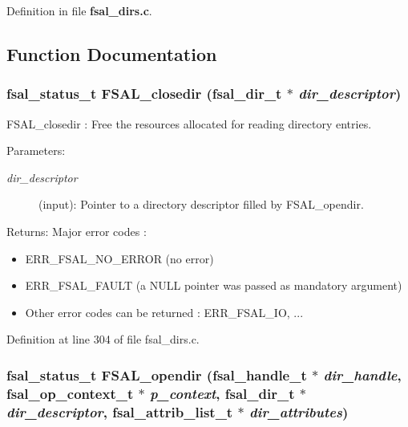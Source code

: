 Definition in file {\bf fsal\_\-dirs.c}.

\subsection{Function Documentation}
\subsubsection[{FSAL\_\-closedir}]{\setlength{\rightskip}{0pt plus 5cm}fsal\_\-status\_\-t FSAL\_\-closedir (fsal\_\-dir\_\-t $\ast$ {\em dir\_\-descriptor})}\label{fsal__dirs_8c_b143cc191cced85fbcaa570922a76556}


FSAL\_\-closedir : Free the resources allocated for reading directory entries.

\begin{Desc}
\item[Parameters:]
\begin{description}
\item[{\em dir\_\-descriptor}](input): Pointer to a directory descriptor filled by FSAL\_\-opendir.\end{description}
\end{Desc}
\begin{Desc}
\item[Returns:]Major error codes :\begin{itemize}
\item ERR\_\-FSAL\_\-NO\_\-ERROR (no error)\item ERR\_\-FSAL\_\-FAULT (a NULL pointer was passed as mandatory argument)\item Other error codes can be returned : ERR\_\-FSAL\_\-IO, ... \end{itemize}
\end{Desc}


Definition at line 304 of file fsal\_\-dirs.c.
\subsubsection[{FSAL\_\-opendir}]{\setlength{\rightskip}{0pt plus 5cm}fsal\_\-status\_\-t FSAL\_\-opendir (fsal\_\-handle\_\-t $\ast$ {\em dir\_\-handle}, \/  fsal\_\-op\_\-context\_\-t $\ast$ {\em p\_\-context}, \/  fsal\_\-dir\_\-t $\ast$ {\em dir\_\-descriptor}, \/  fsal\_\-attrib\_\-list\_\-t $\ast$ {\em dir\_\-attributes})}\label{fsal__dirs_8c_efa996028b523792420c6c3e009ca83f}


